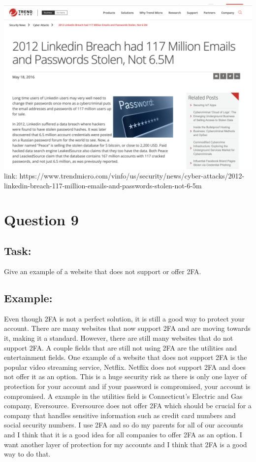 \documentclass{article}
\begin{document}
\begin{center}
    \includegraphics[scale=.22]{images/link_hack.png}
    link: https://www.trendmicro.com/vinfo/us/security/news/cyber-attacks/2012-linkedin-breach-117-million-emails-and-passwords-stolen-not-6-5m
\end{center}

\section{Question 9}
\subsection*{Task:} Give an example of a website that does not support or offer 2FA.

\subsection*{Example:}
Even though 2FA is not a perfect solution, it is still a good way to protect your account. 
There are many websites that now support 2FA and are moving towards it, making it a standard.
However, there are still many websites that do not support 2FA. A couple fields that are still
not using 2FA are the utilities and entertainment fields. One example of a website that does
not support 2FA is the popular video streaming service, Netflix. Netflix does not support 2FA
and does not offer it as an option. This is a huge security risk as there is only one layer of
protection for your account and if your password is compromised, your account is compromised.
A example in the utilities field is Connecticut's Electric and Gas company, Eversource. Eversource
does not offer 2FA which should be crucial for a company that handles sensitive information
such as credit card numbers and social security numbers. I use 2FA and so do my parents for all of our accounts and
I think that it is a good idea for all companies to offer 2FA as an option. I want another layer
of protection for my accounts and I think that 2FA is a good way to do that.
\end{document}
